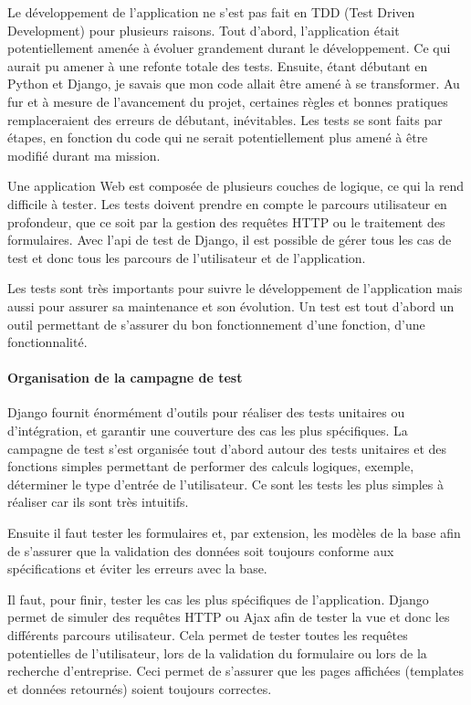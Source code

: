 \documentclass[french]{article}
\begin{document}
{Le développement de l'application ne s'est pas fait en TDD (Test Driven Development) pour plusieurs raisons. Tout d'abord, l'application était potentiellement amenée à évoluer grandement durant le développement. Ce qui aurait pu amener à une refonte totale des tests. Ensuite, étant débutant en Python et Django, je savais que mon code allait être amené à se transformer. Au fur et à mesure de l'avancement du projet, certaines règles et bonnes pratiques remplaceraient des erreurs de débutant, inévitables. Les tests se sont faits par étapes, en fonction du code qui ne serait potentiellement plus amené à être modifié durant ma mission.

Une application Web est composée de plusieurs couches de logique, ce qui la rend difficile à tester. Les tests doivent prendre en compte le parcours utilisateur en profondeur, que ce soit par la gestion des requêtes HTTP ou le traitement des formulaires. Avec l'api de test de Django, il est possible de gérer tous les cas de test et donc tous les parcours de l'utilisateur et de l'application.

Les tests sont très importants pour suivre le développement de l'application mais aussi pour assurer sa maintenance et son évolution. Un test est tout d'abord un outil permettant de s'assurer du bon fonctionnement d'une fonction, d'une fonctionnalité.

\paragraph{Organisation de la campagne de test}

Django fournit énormément d'outils pour réaliser des tests unitaires ou d'intégration, et garantir une couverture des cas les plus spécifiques. 
\newline{}
La campagne de test s'est organisée tout d'abord autour des tests unitaires et des fonctions simples permettant de performer des calculs logiques, exemple, déterminer le type d'entrée de l'utilisateur. Ce sont les tests les plus simples à réaliser car ils sont très intuitifs.

Ensuite il faut tester les formulaires et, par extension, les modèles de la base afin de s'assurer que la validation des données soit toujours conforme aux spécifications et éviter les erreurs avec la base.

Il faut, pour finir, tester les cas les plus spécifiques de l'application. 
\newline{}
Django permet de simuler des requêtes HTTP ou Ajax afin de tester la vue et donc les différents parcours utilisateur. Cela permet de tester toutes les requêtes potentielles de l'utilisateur, lors de la validation du formulaire ou lors de la recherche d'entreprise. Ceci permet de s'assurer que les pages affichées (templates et données retournés) soient toujours correctes.

}
\end{document}

